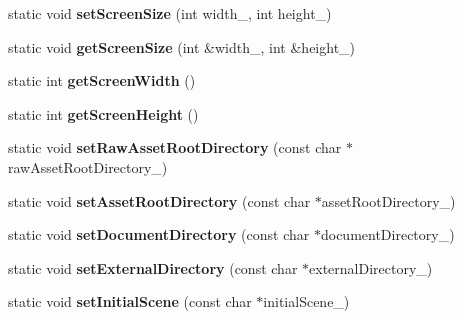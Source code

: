 \begin{DoxyCompactItemize}
\item 
static void {\bfseries set\+Screen\+Size} (int width\+\_\+, int height\+\_\+)\hypertarget{class_magnum_1_1_stage_ad3826607acd2c56761d8e9228c0d6a1c}{}\label{class_magnum_1_1_stage_ad3826607acd2c56761d8e9228c0d6a1c}

\item 
static void {\bfseries get\+Screen\+Size} (int \&width\+\_\+, int \&height\+\_\+)\hypertarget{class_magnum_1_1_stage_a8ec8347f262685b0bc1676b572094c97}{}\label{class_magnum_1_1_stage_a8ec8347f262685b0bc1676b572094c97}

\item 
static int {\bfseries get\+Screen\+Width} ()\hypertarget{class_magnum_1_1_stage_aa06373952ebf793dcfbe7319bf8b6943}{}\label{class_magnum_1_1_stage_aa06373952ebf793dcfbe7319bf8b6943}

\item 
static int {\bfseries get\+Screen\+Height} ()\hypertarget{class_magnum_1_1_stage_a02f48392f8ac7f71421b0bf91eca7122}{}\label{class_magnum_1_1_stage_a02f48392f8ac7f71421b0bf91eca7122}

\item 
static void {\bfseries set\+Raw\+Asset\+Root\+Directory} (const char $\ast$raw\+Asset\+Root\+Directory\+\_\+)\hypertarget{class_magnum_1_1_stage_a5b0803e2671963dcd2d9e52467f5ce56}{}\label{class_magnum_1_1_stage_a5b0803e2671963dcd2d9e52467f5ce56}

\item 
static void {\bfseries set\+Asset\+Root\+Directory} (const char $\ast$asset\+Root\+Directory\+\_\+)\hypertarget{class_magnum_1_1_stage_acf2d594f822f20785e3238841ec1c9d1}{}\label{class_magnum_1_1_stage_acf2d594f822f20785e3238841ec1c9d1}

\item 
static void {\bfseries set\+Document\+Directory} (const char $\ast$document\+Directory\+\_\+)\hypertarget{class_magnum_1_1_stage_ac8e8b0d21cc2d77c3885b600f0640cb9}{}\label{class_magnum_1_1_stage_ac8e8b0d21cc2d77c3885b600f0640cb9}

\item 
static void {\bfseries set\+External\+Directory} (const char $\ast$external\+Directory\+\_\+)\hypertarget{class_magnum_1_1_stage_ae24979bfe7cd591e6c2eceea698466f4}{}\label{class_magnum_1_1_stage_ae24979bfe7cd591e6c2eceea698466f4}

\item 
static void {\bfseries set\+Initial\+Scene} (const char $\ast$initial\+Scene\+\_\+)\hypertarget{class_magnum_1_1_stage_a8c9525cf84bb832ae5a812bc34790871}{}\label{class_magnum_1_1_stage_a8c9525cf84bb832ae5a812bc34790871}


\end{DoxyCompactItemize}
